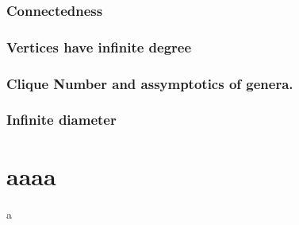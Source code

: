 \documentclass[handout]{beamer}
\theoremstyle{plain}
\begin{document}
\begin{frame}
\frametitle{Connectedness}

\end{frame}

\begin{frame}
\frametitle{Vertices have  infinite  degree}

\end{frame}

\begin{frame}

\frametitle{Clique Number  and assymptotics  of  genera.}

\end{frame}

\begin{frame}\frametitle{Infinite  diameter}

\end{frame}


\section{aaaa }
\begin{frame}

a
\end{frame}
\end{document}
